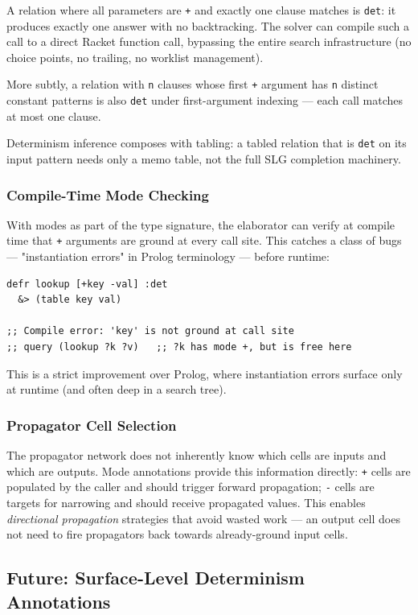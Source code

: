 \documentclass[11pt]{article}
\begin{document}
A relation where all parameters are \texttt{+} and exactly one clause matches is
\texttt{det}: it produces exactly one answer with no backtracking. The solver can
compile such a call to a direct Racket function call, bypassing the entire
search infrastructure (no choice points, no trailing, no worklist management).

More subtly, a relation with \texttt{n} clauses whose first \texttt{+} argument has \texttt{n}
distinct constant patterns is also \texttt{det} under first-argument indexing --- each
call matches at most one clause.

Determinism inference composes with tabling: a tabled relation that is \texttt{det} on
its input pattern needs only a memo table, not the full SLG completion machinery.
\subsubsection{Compile-Time Mode Checking}
\label{sec:org01490a5}

With modes as part of the type signature, the elaborator can verify at compile
time that \texttt{+} arguments are ground at every call site. This catches a class of
bugs --- "instantiation errors" in Prolog terminology --- before runtime:

\begin{verbatim}
defr lookup [+key -val] :det
  &> (table key val)

;; Compile error: 'key' is not ground at call site
;; query (lookup ?k ?v)   ;; ?k has mode +, but is free here
\end{verbatim}

This is a strict improvement over Prolog, where instantiation errors surface
only at runtime (and often deep in a search tree).
\subsubsection{Propagator Cell Selection}
\label{sec:org2cbad89}

The propagator network does not inherently know which cells are inputs and which
are outputs. Mode annotations provide this information directly: \texttt{+} cells are
populated by the caller and should trigger forward propagation; \texttt{-} cells are
targets for narrowing and should receive propagated values. This enables
\emph{directional propagation} strategies that avoid wasted work --- an output cell
does not need to fire propagators back towards already-ground input cells.
\subsection{Future: Surface-Level Determinism Annotations}
\label{sec:org4516f19}
\end{document}

